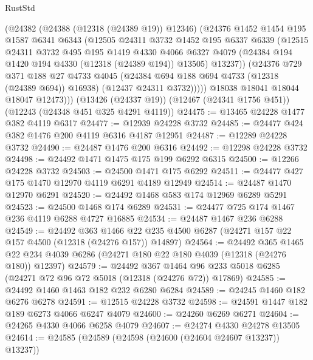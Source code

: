 \begin{lexlean}{RustStd}
\begin{coremodule}
            (@24382
              (@24388 (@12318 (@24389 @19)) @12346)
              (@24376
                @1452
                @1454
                @195
                @1587
                @6341
                @6343
                (@12505
                  @24311
                  @3732
                  @1452
                  @195
                  @6337
                  @6339
                  (@12515
                    @24311
                    @3732
                    @495
                    @195
                    @1419
                    @4330
                    @4066
                    @6327
                    @4079
                    (@24384 @194 @1420 @194 @4330 (@12318 (@24389 @194)) @13505)
                    @13237))
                (@24376
                  @729
                  @371
                  @188
                  @27
                  @4733
                  @4045
                  (@24384 @694 @188 @694 @4733 (@12318 (@24389 @694)) @16938)
                  (@12437 @24311 @3732)))))
          @18038
          @18041
          @18044
          @18047
          @12473)))
    (@13426 (@24337 @19))
    (@12467 (@24341 @1756 @451))
    (@12243 (@24348 @451 @325 @4291 @4119))
@24475 := @13465 @24228 @1477 @382 @4119 @6317
@24477 := @12939 @24228 @3732
@24485 := @24477 @424 @382 @1476 @200 @4119 @6316 @4187 @12951
@24487 := @12289 @24228 @3732
@24490 := @24487 @1476 @200 @6316
@24492 := @12298 @24228 @3732
@24498 := @24492 @1471 @1475 @175 @199 @6292 @6315
@24500 := @12266 @24228 @3732
@24503 := @24500 @1471 @175 @6292
@24511 := @24477 @427 @175 @1470 @12970 @4119 @6291 @4189 @12949
@24514 := @24487 @1470 @12970 @6291
@24520 := @24492 @1468 @583 @174 @12969 @6289 @5291
@24523 := @24500 @1468 @174 @6289
@24531 := @24477 @725 @174 @1467 @236 @4119 @6288 @4727 @16885
@24534 := @24487 @1467 @236 @6288
@24549 := @24492
    @363
    @1466
    @22
    @235
    @4500
    @6287
    (@24271 @157 @22 @157 @4500 (@12318 (@24276 @157)) @14897)
@24564 := @24492
    @365
    @1465
    @22
    @234
    @4039
    @6286
    (@24271 @180 @22 @180 @4039 (@12318 (@24276 @180)) @12397)
@24579 := @24492
    @367
    @1464
    @96
    @233
    @5018
    @6285
    (@24271 @72 @96 @72 @5018 (@12318 (@24276 @72)) @17869)
@24585 := @24492 @1460 @1463 @182 @232 @6280 @6284
@24589 := @24245 @1460 @182 @6276 @6278
@24591 := @12515 @24228 @3732
@24598 := @24591 @1447 @182 @189 @6273 @4066 @6247 @4079
@24600 := @24260 @6269 @6271
@24604 := @24265 @4330 @4066 @6258 @4079
@24607 := @24274 @4330 @24278 @13505
@24614 := @24585 (@24589 (@24598 (@24600 (@24604 @24607 @13237)) @13237))

\end{coremodule}
\end{lexlean}
